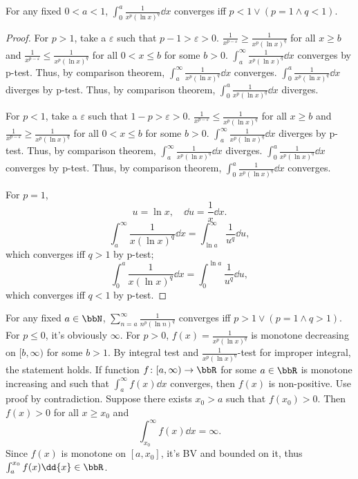 For any fixed $0<a<1$,
$\int_0^a\frac{1}{x^p(\ln x)^q}\dd{x}$ converges iff $p<1\lor(p=1\land q<1)$.
\begin{proof}
For $p>1$, take a $\varepsilon$ such that $p-1>\varepsilon>0$. $\frac{1}{x^{p-\varepsilon}}\ge\frac{1}{x^p(\ln x)^q}$ for all $x\ge b$ and $\frac{1}{x^{p-\varepsilon}}\le\frac{1}{x^p(\ln x)^q}$ for all $0<x\le b$ for some $b>0$. $\int_a^{\infty}\frac{1}{x^p(\ln x)^q}\dd{x}$ converges by p-test. Thus, by comparison theorem, $\int_a^{\infty}\frac{1}{x^p(\ln x)^q}\dd{x}$ converges. $\int_0^a\frac{1}{x^p(\ln x)^q}\dd{x}$ diverges by p-test. Thus, by comparison theorem, $\int_0^a\frac{1}{x^p(\ln x)^q}\dd{x}$ diverges.

For $p<1$, take a $\varepsilon$ such that $1-p>\varepsilon>0$. $\frac{1}{x^{p-\varepsilon}}\le\frac{1}{x^p(\ln x)^q}$ for all $x\ge b$ and $\frac{1}{x^{p-\varepsilon}}\ge\frac{1}{x^p(\ln x)^q}$ for all $0<x\le b$ for some $b>0$. $\int_a^{\infty}\frac{1}{x^p(\ln x)^q}\dd{x}$ diverges by p-test. Thus, by comparison theorem, $\int_a^{\infty}\frac{1}{x^p(\ln x)^q}\dd{x}$ diverges. $\int_0^a\frac{1}{x^p(\ln x)^q}\dd{x}$ converges by p-test. Thus, by comparison theorem, $\int_0^a\frac{1}{x^p(\ln x)^q}\dd{x}$ converges.

For $p=1$,
\[u=\ln x,\quad\dd{u}=\frac{1}{x}\dd{x}.\]
\[\int_a^{\infty}\frac{1}{x(\ln x)^q}\dd{x}=\int_{\ln a}^{\infty}\frac{1}{u^q}\dd{u},\]
which converges iff $q>1$ by p-test;
\[\int_0^a\frac{1}{x(\ln x)^q}\dd{x}=\int_0^{\ln a}\frac{1}{u^q}\dd{u},\]
which converges iff $q<1$ by p-test.
\end{proof}
For any fixed $a\in\bbN$, $\sum_{n=a}^{\infty}\frac{1}{n^p(\ln n)^q}$ converges iff $p>1\lor(p=1\land q>1)$.
\bpr
For $p\le0$, it's obviously $\infty$. For $p>0$, $f(x)=\frac{1}{x^p(\ln x)^q}$ is monotone decreasing on $[b,\infty)$ for some $b>1$. By integral test and $\frac{1}{x^p(\ln x)^q}$-test for improper integral, the statement holds.
\epr
{}
If function $f\colon[a,\infty)\to\bbR$ for some $a\in\bbR$ is monotone increasing and such that $\int_a^{\infty}f(x)\dd{x}$ converges, then $f(x)$ is non-positive.
\bpr
Use proof by contradiction. Suppose there exists $x_0>a$ such that $f(x_0)>0$. Then $f(x)>0$ for all $x\ge x_0$ and
\[\int_{x_0}^{\infty}f(x)\dd{x}=\infty.\]
Since $f(x)$ is monotone on $[a,x_0]$, it's BV and bounded on it, thus $\int_a^{x_0}f(x)\dd{x}\in\bbR$.

